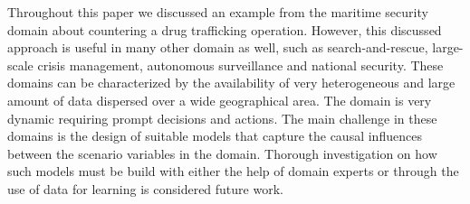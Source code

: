 \documentclass[conference]{IEEEtran}
\begin{document}
Throughout this paper we discussed an example from the maritime security domain about countering a drug trafficking operation. However, this discussed approach is useful in many other domain as well, such as search-and-rescue, large-scale crisis management, autonomous surveillance and national security. These domains can be characterized by the availability of very heterogeneous and large amount of data dispersed over a wide geographical area. The domain is very dynamic requiring prompt decisions and actions. The main challenge in these domains is the design of suitable models that capture the causal influences between the scenario variables in the domain. Thorough investigation on how such models must be build with either the help of domain experts or through the use of data for learning is considered future work.
\end{document}
